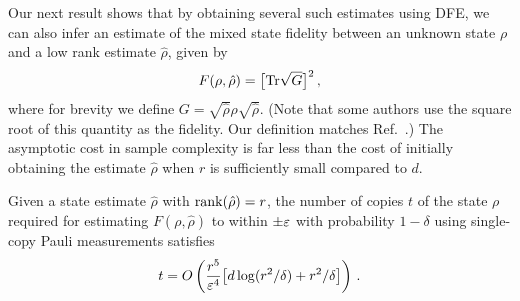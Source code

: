 Our next result shows that by obtaining several such estimates using DFE, we can also infer an estimate of the mixed state fidelity between an unknown state $\rho$ and a low rank estimate $\hat\rho$, given by
\begin{align}\label{E:fidelity-def}
	F(\rho,\hat\rho) = \bigl[\mathrm{Tr} \sqrt{G}\bigr]^2\,,
\end{align}
where for brevity we define $G = \sqrt{\hat\rho}\rho\sqrt{\hat\rho}$. (Note that some authors use the square root of this quantity as the fidelity. Our definition matches Ref.~\cite{Flammia2011}.) The asymptotic cost in sample complexity is far less than the cost of initially obtaining the estimate $\hat\rho$ when $r$ is sufficiently small compared to $d$.

\begin{theorem}
Given a state estimate $\hat\rho$ with $\operatorname{rank}(\hat\rho) = r$, the number of copies $t$ of the state $\rho$ required for estimating $F(\rho,\hat\rho)$ to within $\pm\varepsilon$ with probability $1-\delta$ using single-copy Pauli measurements satisfies 
\begin{align}
	t=O\left(\frac{r^5}{\varepsilon^4}\bigr[d \log(r^2/\delta) + r^2/\delta\bigl]\right) \,.
\end{align}
\end{theorem}
